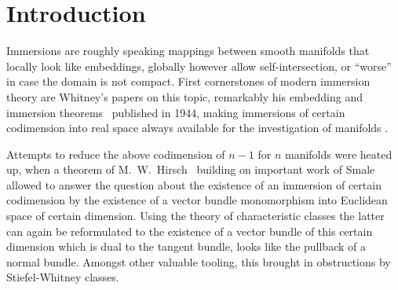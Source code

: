 % 

\chapter{Introduction}


Immersions are roughly speaking mappings between smooth
manifolds that locally look like embeddings, globally however
allow self-intersection, or \enquote{worse} in case the domain is not
compact.
First cornerstones of modern immersion theory are Whitney's papers on this
topic, remarkably his embedding and immersion
theorems~\cite{whitneyimmersiontheorem} published in 1944, making
immersions of certain codimension into real space always available for the
investigation of manifolds
\cite{immersiontheoryhistory,hirsch}.

Attempts to reduce the above codimension of $n-1$ for $n$ manifolds
were heated up, when a theorem of
M.~W.~Hirsch~\cite{hirschimmersions} building on important work of
Smale allowed to answer the question about the existence of an
immersion of certain codimension by the 
existence of a vector bundle monomorphism into Euclidean space of
certain dimension.
Using the theory of characteristic classes the latter can again be
reformulated to the existence of a vector bundle of this certain
dimension which is dual to the tangent bundle, \idest looks
like the pullback of a normal bundle.
Amongst other valuable tooling, this brought in obstructions by
Stiefel-Whitney classes.

